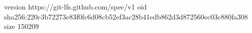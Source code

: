 version https://git-lfs.github.com/spec/v1
oid sha256:220c3b72273e83f0fc6d08cb52ef3ac28b41edb862d3d872560ec03c880fa308
size 150209
